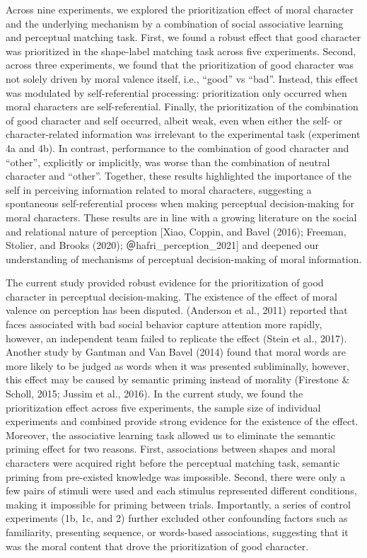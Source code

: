 \documentclass[
  man]{apa6}
\begin{document}
Across nine experiments, we explored the prioritization effect of moral character and the underlying mechanism by a combination of social associative learning and perceptual matching task. First, we found a robust effect that good character was prioritized in the shape-label matching task across five experiments. Second, across three experiments, we found that the prioritization of good character was not solely driven by moral valence itself, i.e., ``good'' vs ``bad''. Instead, this effect was modulated by self-referential processing: prioritization only occurred when moral characters are self-referential. Finally, the prioritization of the combination of good character and self occurred, albeit weak, even when either the self- or character-related information was irrelevant to the experimental task (experiment 4a and 4b). In contrast, performance to the combination of good character and ``other'', explicitly or implicitly, was worse than the combination of neutral character and ``other''. Together, these results highlighted the importance of the self in perceiving information related to moral characters, suggesting a spontaneous self-referential process when making perceptual decision-making for moral characters. These results are in line with a growing literature on the social and relational nature of perception {[}Xiao, Coppin, and Bavel (2016); Freeman, Stolier, and Brooks (2020); ＠hafri\_perception\_2021{]} and deepened our understanding of mechanisms of perceptual decision-making of moral information.

The current study provided robust evidence for the prioritization of good character in perceptual decision-making. The existence of the effect of moral valence on perception has been disputed. (Anderson et al., 2011) reported that faces associated with bad social behavior capture attention more rapidly, however, an independent team failed to replicate the effect (Stein et al., 2017). Another study by Gantman and Van Bavel (2014) found that moral words are more likely to be judged as words when it was presented subliminally, however, this effect may be caused by semantic priming instead of morality (Firestone \& Scholl, 2015; Jussim et al., 2016). In the current study, we found the prioritization effect across five experiments, the sample size of individual experiments and combined provide strong evidence for the existence of the effect. Moreover, the associative learning task allowed us to eliminate the semantic priming effect for two reasons. First, associations between shapes and moral characters were acquired right before the perceptual matching task, semantic priming from pre-existed knowledge was impossible. Second, there were only a few pairs of stimuli were used and each stimulus represented different conditions, making it impossible for priming between trials. Importantly, a series of control experiments (1b, 1c, and 2) further excluded other confounding factors such as familiarity, presenting sequence, or words-based associations, suggesting that it was the moral content that drove the prioritization of good character.
\end{document}
